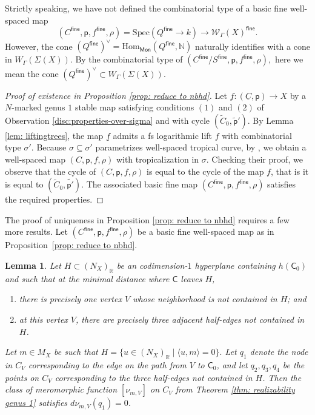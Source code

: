 \documentclass{article}
\def\N{{\mathbb{N}}}
\newtheorem{lemma}[definition]{Lemma}
\newcommand{\tropC}{\mathsf{C}}
\newcommand{\fine}{\mathsf{fine}}
\begin{document}
Strictly speaking, we have not defined the combinatorial type of a basic fine well-spaced map
$$
(C^{\mathsf{fine}}, \mathsf{p}, f^{\mathsf{fine}}, \rho)=\mathrm{Spec}(Q^\fine \to k)
\to \mathcal{W}_{\Gamma}(X)^{\mathsf{fine}}.
$$
However, the cone \((Q^{\mathsf{fine}})^\vee=\mathrm{Hom}_{\mathsf{Mon}}(Q^\fine,\N)\) naturally identifies with a cone in \(W_{\Gamma}(\Sigma(X))\). By the combinatorial type of
$
(C^{\mathsf{fine}}/S^{\mathsf{fine}}, \mathsf{p}, f^{\mathsf{fine}}, \rho),
$
here we mean the cone \( (Q^{\mathsf{fine}})^\vee \subset W_{\Gamma}(\Sigma(X))\).


\begin{proof}[Proof of existence in Proposition \ref{prop: reduce to nbhd}]
     Let $\underline{f}: (\underline{C},\mathsf{p}) \rightarrow X$ by a $N$-marked genus $1$ stable map satisfying conditions $(1)$ and $(2)$ of Observation \ref{disc:properties-over-sigma} and with cycle $(\widetilde{C}_0,\widetilde{\mathsf{p}}')$. By Lemma \ref{lem: liftingtrees}, the map $\underline{f}$ admits a fs logarithmic lift $f$ with combinatorial type $\sigma'$. Because $\sigma \subseteq \sigma'$ parametrizes well-spaced tropical curve, by \cite[Theorem 4.4.8]{RSWII}, we obtain a well-spaced map $(C,\mathsf{p},f,\rho)$ with tropicalization in $\sigma$. Checking their proof, we observe that the cycle of $(C,\mathsf{p},f,\rho)$ is equal to the cycle of the map $f$, that is it is equal to $(\widetilde{C}_0,\widetilde{\mathsf{p}'})$. The associated basic fine map $(C^\fine ,\mathsf{p},f^\fine,\rho)$ satisfies the required properties.
\end{proof}

The proof of uniqueness in Proposition \ref{prop: reduce to nbhd} requires a few more results. Let $(C^{\mathsf{fine}}, \mathsf{p}, f^{\mathsf{fine}}, \rho)$ be a basic fine well-spaced map as in Proposition~\ref{prop: reduce to nbhd}.

\begin{lemma} \label{lem: one-branch-vanishing derivative}
Let $H \subset (N_X)_\mathbb{R}$ be an codimension-$1$ hyperplane containing $h(\tropC_0)$ and such that at the minimal distance where $\tropC$ leaves $H$, 
\begin{enumerate}
    \item there is precisely one vertex $V$ whose neighborhood is not contained in $H$; and 
    \item at this vertex $V$, there are precisely three adjacent half-edges not contained in $H$. 
\end{enumerate}

Let $m \in M_X$ be such that 
$
H = \{u \in (N_X)_\mathbb{R} \mid \langle u, m \rangle = 0\}.
$
Let $q_1$ denote the node in $C_V$ corresponding to the edge on the path from $V$ to $\tropC_0$, and let $q_2, q_3, q_4$ be the points on $C_V$ corresponding to the three half-edges not contained in $H$. Then the class of meromorphic function $[\nu_{m,V}]$ on $C_V$ from Theorem \ref{thm: realizability genus 1} satisfies  $d\nu_{m,V}(q_1) = 0$.
\end{lemma}
\end{document}
